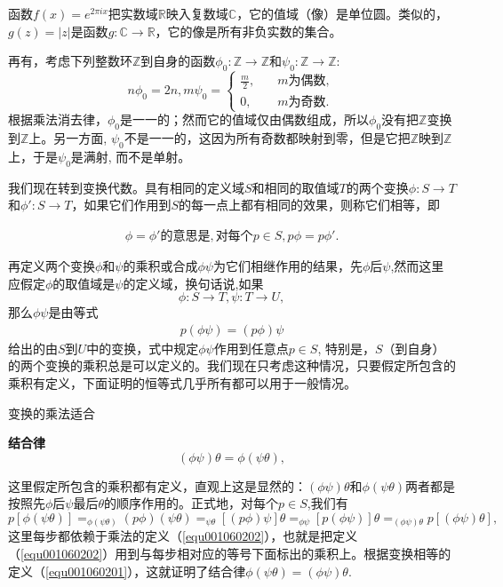函数$f(x)=e^{2\pi{}ix}$把实数域$\mathbb{R}$映入复数域$\mathbb{C}$，它的值域（像）是单位圆。类似的，$g(z)=|z|$是函数$g:\mathbb{C} \to \mathbb{R}$，它的像是所有非负实数的集合。

再有，考虑下列整数环$\mathbb{Z}$到自身的函数$\phi_0:\mathbb{Z} \to \mathbb{Z}$和$\psi_0:\mathbb{Z} \to \mathbb{Z}$:
\[
n\phi_0 = 2n, m\psi_0 = \left\{
\begin{aligned}
\frac{m}{2}, & \quad m \text{为偶数},\\
0,&\quad m \text{为奇数}.
\end{aligned}
\right.
\]
根据乘法消去律，$\phi_0$是一一的；然而它的值域仅由偶数组成，所以$\phi_0$没有把$\mathbb{Z}$变换到$\mathbb{Z}$上。另一方面, $\psi_0$不是一一的，这因为所有奇数都映射到零，但是它把$\mathbb{Z}$映到$\mathbb{Z}$上，于是$\psi_0$是满射, 而不是单射。

我们现在转到变换代数。具有相同的定义域$S$和相同的取值域$T$的两个变换$\phi:S \to T$和$\phi':S \to T$，如果它们作用到$S$的每一点上都有相同的效果，则称它们相等，即

\begin{gather}\label{equ001060201}
\phi = \phi'\text{的意思是},\text{对每个}p \in S, p\phi = p\phi'.
\end{gather}

再定义两个变换$\phi$和$\psi$的乘积或合成$\phi\psi$为它们相继作用的结果，先$\phi$后$\psi$,然而这里应假定$\phi$的取值域是$\psi$的定义域，换句话说,如果
\[
\phi: S \to T, \psi: T \to U,
\]
那么$\phi\psi$是由等式
\begin{gather}\label{equ001060202}
p(\phi\psi) = (p\phi)\psi
\end{gather}
给出的由$S$到$U$中的变换，式中规定$\phi\psi$作用到任意点$p \in S$, 特别是，$S$（到自身）的两个变换的乘积总是可以定义的。我们现在只考虑这种情况，只要假定所包含的乘积有定义，下面证明的恒等式几乎所有都可以用于一般情况。

变换的乘法适合

\textbf{结合律}
\[
(\phi\psi)\theta = \phi(\psi\theta),
\]

这里假定所包含的乘积都有定义，直观上这是显然的：$(\phi\psi)\theta$和$\phi(\psi\theta)$两者都是按照先$\phi$后$\psi$最后$\theta$的顺序作用的。正式地，对每个$p \in S$,我们有
\[
p[\phi(\psi\theta)] \mathop{=}_{\phi(\psi\theta)}(p\phi)(\psi\theta) \mathop{=}_{\psi\theta} [(p\phi)\psi]\theta \mathop{=}_{\phi\psi} [p(\phi\psi)]\theta \mathop{=}_{(\phi\psi)\theta} p[(\phi\psi)\theta],
\]
这里每步都依赖于乘法的定义（\ref{equ001060202}），也就是把定义（\ref{equ001060202}）用到与每步相对应的等号下面标出的乘积上。根据变换相等的定义（\ref{equ001060201}），这就证明了结合律$\phi(\psi\theta)=(\phi\psi)\theta$.

